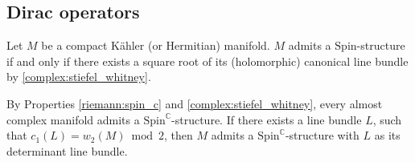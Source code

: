 
\subsection{Dirac operators}

    \begin{property}
        Let $M$ be a compact K\"ahler (or Hermitian) manifold. $M$ admits a $\mathrm{Spin}$-structure if and only if there exists a square root of its (holomorphic) canonical line bundle by \ref{complex:stiefel_whitney}.
    \end{property}

    \begin{property}
        By Properties \ref{riemann:spin_c} and \ref{complex:stiefel_whitney}, every almost complex manifold admits a $\mathrm{Spin}^\mathbb{C}$-structure. If there exists a line bundle $L$, such that $c_1(L)=w_2(M)\bmod2$, then $M$ admits a $\mathrm{Spin}^\mathbb{C}$-structure with $L$ as its determinant line bundle.
    \end{property}

